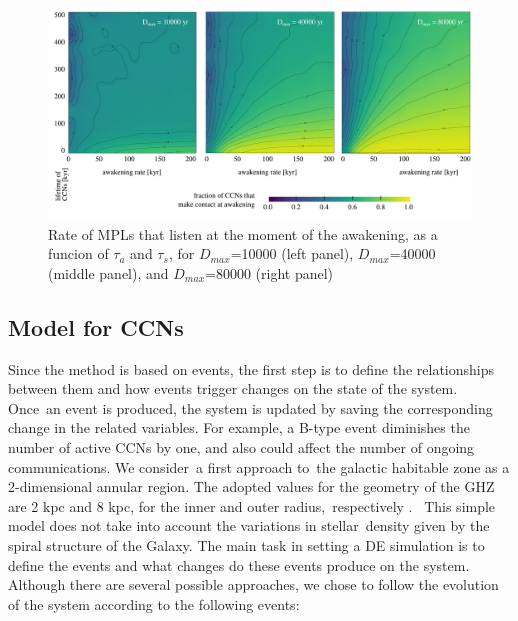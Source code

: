 \documentclass[crop]{CSLB}
\newcommand{\cetis}{CCNs}
\begin{document}
\begin{figure} %
   \centering
   \includegraphics[width=\textwidth]{F_C_at_A.pdf}
   \caption{
Rate of MPLs that listen at the moment of the
awakening, as a funcion of $\tau_a$ and $\tau_s$, for
$D_{max}$=10000 (left panel),
$D_{max}$=40000 (middle panel), and
$D_{max}$=80000 (right panel)
%
   }
   \label{F_C_at_A}
\end{figure}
        

                     

\subsection{Model for \cetis{}}

Since the method is based on events, the first step is to define the relationships between them and how events trigger changes on the state of the system.
%
Once an event is produced, the system is updated by saving the corresponding change in the related variables.
%
For example, a B-type event diminishes the number of active \cetis{} by one, and also could affect the number of ongoing communications.
%
We consider a first approach to the galactic habitable zone as a 2-dimensional annular region.
%
The adopted values for the geometry of the GHZ are 2 kpc and 8 kpc, for the inner and outer radius, respectively \citep{lineweaver_galactic_2004}. 
%
This simple model does not take into account the variations in stellar density given by the spiral structure of the Galaxy.
%
The main task in setting a DE simulation is to define the events and what changes do these events produce on the system.
%
Although there are several possible approaches, we chose to follow the evolution of the system according to the following events:
\end{document}

